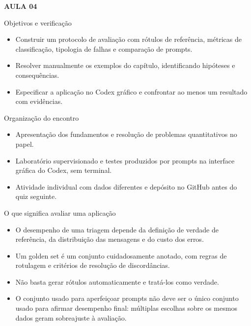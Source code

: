 \documentclass[10pt,aspectratio=169]{beamer}
\begin{document}
\begin{frame}[t]{}
\vspace{14mm}\textcolor{InsperRed}{\bfseries AULA 04}\par\vspace{4mm}{\LARGE\bfseries Avaliação de aplicações com LLMs}\par\vspace{6mm}{\large Operações empresariais}\par{}
\end{frame}

\begin{frame}[t]{Objetivos e verificação}
\small
\begin{itemize}
\item Construir um protocolo de avaliação com rótulos de referência, métricas de classificação, tipologia de falhas e comparação de prompts.
\item Resolver manualmente os exemplos do capítulo, identificando hipóteses e consequências.
\item Especificar a aplicação no Codex gráfico e confrontar ao menos um resultado com evidências.
\end{itemize}
\end{frame}

\begin{frame}[t]{Organização do encontro}
\small
\begin{itemize}
\item Apresentação dos fundamentos e resolução de problemas quantitativos no papel.
\item Laboratório supervisionado e testes produzidos por prompts na interface gráfica do Codex, sem terminal.
\item Atividade individual com dados diferentes e depósito no GitHub antes do quiz seguinte.
\end{itemize}
\end{frame}

\begin{frame}[t]{O que significa avaliar uma aplicação}
\small
\begin{itemize}
\item O desempenho de uma triagem depende da definição de verdade de referência, da distribuição das mensagens e do custo dos erros.
\item Um golden set é um conjunto cuidadosamente anotado, com regras de rotulagem e critérios de resolução de discordâncias.
\item Não basta gerar rótulos automaticamente e tratá-los como verdade.
\item O conjunto usado para aperfeiçoar prompts não deve ser o único conjunto usado para afirmar desempenho final: múltiplas escolhas sobre os mesmos dados geram sobreajuste à avaliação.
\end{itemize}
\end{frame}
\end{document}

